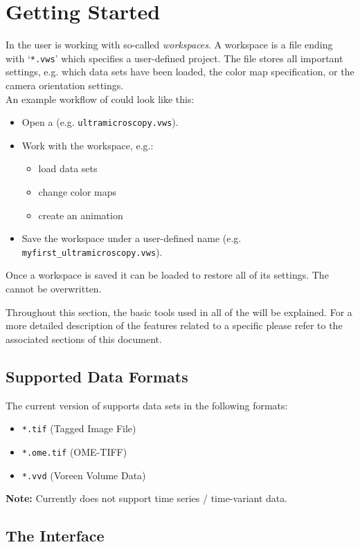\section{Getting Started} \label{getting_started}
In \Voreen the user is working with so-called \emph{workspaces}. A workspace is a file ending with `\verb|*.vws|' which specifies a user-defined project. 
The file stores all important settings, e.g. which data sets have been loaded, the color map specification, or the camera orientation settings.\\
An example workflow of \Voreen could look like this:
\begin{itemize}
\item Open a \workspace (e.g. \verb|ultramicroscopy.vws|).
\item Work with the workspace, e.g.:
\begin{itemize}
	\item load data sets
	\item change color maps
	\item create an animation
\end{itemize}
\item Save the workspace under a user-defined name (e.g. \verb|myfirst_ultramicroscopy.vws|).
\end{itemize}
Once a workspace is saved it can be loaded to restore all of its settings. The \workspaces cannot be overwritten.

Throughout this section, the basic tools used in all of the \workspaces will be explained. 
For a more detailed description of the features related to a specific \workspace please refer to the associated sections of this document.

\subsection{Supported Data Formats}
\label{section:data_formats}

The current version of \Voreen supports data sets in the following formats:
\begin{itemize}
	\item \verb|*.tif| (Tagged Image File)
	\item \verb|*.ome.tif| (OME-TIFF)
	\item \verb|*.vvd| (Voreen Volume Data) 
\end{itemize}
\textbf{Note:} Currently \Voreen does not support time series / time-variant data. 

\subsection{The Interface}
\label{section:interface}

